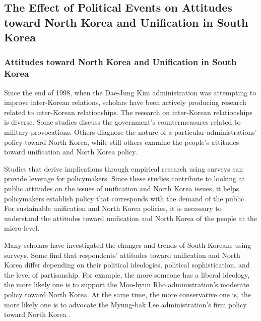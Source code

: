 \documentclass[letterpaper,9pt,twocolumn,twoside,]{pinp}
\begin{document}
\hypertarget{the-effect-of-political-events-on-attitudes-toward-north-korea-and-unification-in-south-korea}{%
\subsection{The Effect of Political Events on Attitudes toward North
Korea and Unification in South
Korea}\label{the-effect-of-political-events-on-attitudes-toward-north-korea-and-unification-in-south-korea}}

\hypertarget{attitudes-toward-north-korea-and-unification-in-south-korea}{%
\subsubsection{Attitudes toward North Korea and Unification in South
Korea}\label{attitudes-toward-north-korea-and-unification-in-south-korea}}

Since the end of 1998, when the Dae-Jung Kim administration was
attempting to improve inter-Korean relations, scholars have been
actively producing research related to inter-Korean relationships. The
research on inter-Korean relationships is diverse. Some studies discuss
the government's countermeasures related to military provocations.
Others diagnose the nature of a particular administrations' policy
toward North Korea, while still others examine the people's attitudes
toward unification and North Korea policy.

Studies that derive implications through empirical research using
surveys can provide leverage for policymakers. Since these studies
contribute to looking at public attitudes on the issues of unification
and North Korea issues, it helps policymakers establish policy that
corresponds with the demand of the public. For sustainable unification
and North Korea policies, it is necessary to understand the attitudes
toward unification and North Korea of the people at the micro-level.

Many scholars have investigated the changes and trends of South Koreans
using surveys. Some find that respondents' attitudes toward unification
and North Korea differ depending on their political ideologies,
political sophistication, and the level of partisanship. For example,
the more someone has a liberal ideology, the more likely one is to
support the Moo-hyun Rho administration's moderate policy toward North
Korea. At the same time, the more conservative one is, the more likely
one is to advocate the Myung-bak Lee administration's firm policy toward
North Korea \citep{SongKwon2013}.
\end{document}
